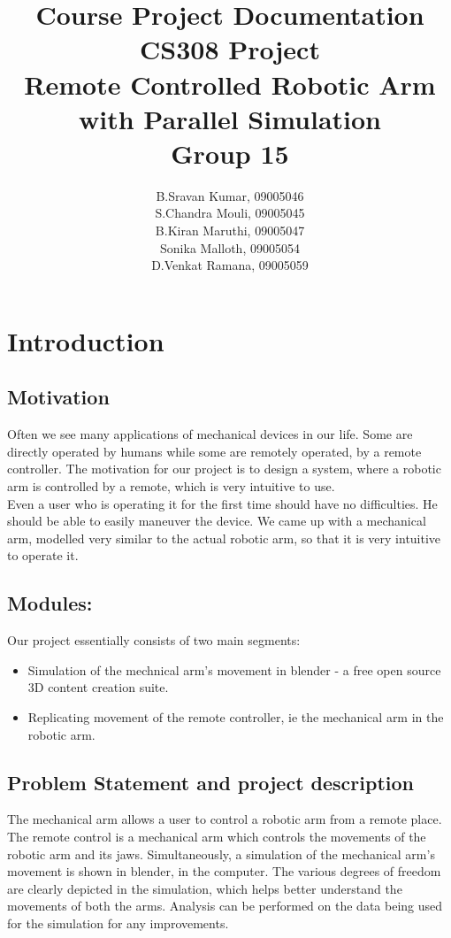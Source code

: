\documentclass[a4wide]{article}
\title{Course Project Documentation\\ 
\hbox{}
CS308 Project\\
\hbox{}
{\textbf{Remote Controlled Robotic Arm \\with Parallel Simulation}}\\
\hbox{} 
Group 15}
\author{ B.Sravan Kumar, 09005046\\ S.Chandra Mouli, 09005045\\B.Kiran Maruthi, 09005047\\Sonika Malloth, 09005054\\D.Venkat Ramana, 09005059}
\date{}
\begin{document}
 
\maketitle
\newpage
\tableofcontents
\newpage
\section{Introduction}

\subsection{Motivation}
Often we see many applications of mechanical devices in our life. Some are directly operated by humans while some are remotely operated, by a remote controller. The motivation for our project is to design a system, where a robotic arm is controlled by a remote, which is very intuitive to use. \\

Even a user who is operating it for the first time should have no difficulties. He should be able to easily maneuver the device. We came up with a mechanical arm, modelled very similar to the actual robotic arm, so that it is very intuitive to operate it.  

\subsection{Modules:}
Our project essentially consists of two main segments:

\begin{itemize}
\item Simulation of the mechnical arm's movement in blender - a free open source 3D content creation suite.
\item Replicating movement of the remote controller, ie the mechanical arm in the robotic arm.
\end{itemize}


\subsection{Problem Statement and project description}
\hbox{}
\hspace{0.15in} The mechanical arm allows a user to control a robotic arm from a remote place. The remote control is a mechanical arm which controls the movements of the robotic arm and its jaws. Simultaneously, a simulation of the mechanical arm's movement is shown in blender, in the computer. The various degrees of freedom are clearly depicted in the simulation, which helps better understand the movements of both the arms. Analysis can be performed on the data being used for the simulation for any improvements. \\
\end{document}
